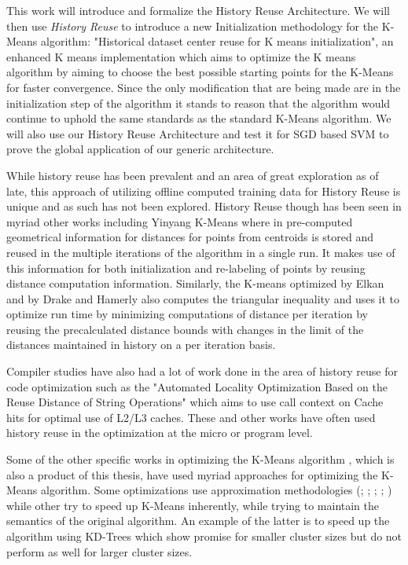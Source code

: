 \documentclass{vldb}
\begin{document}
This work will introduce and formalize the History Reuse Architecture. We will then use \textit{History Reuse} to introduce a new Initialization methodology for the K-Means algorithm: "Historical dataset center reuse for K means initialization", an enhanced K means implementation which aims to optimize the K means algorithm by aiming to choose the best possible starting points for the K-Means\cite{kmeans_orig} for faster convergence. Since the only modification that are being made are in the initialization step of the algorithm it stands to reason that the algorithm would continue to uphold the same standards as the standard K-Means algorithm. We will also use our History Reuse Architecture and test it for SGD based SVM\cite{sgd_svm} to prove the global application of our generic architecture.

While history reuse has been prevalent and an area of great exploration as of late, this approach of utilizing offline computed training data for History Reuse is unique and as such has not been explored. History Reuse though has been seen in myriad other works including Yinyang K-Means \cite{yinyang_kmeans} where in pre-computed geometrical information for distances for points from centroids is stored and reused in the multiple iterations of the algorithm in a single run. It makes use of this information for both initialization and re-labeling of points by reusing distance computation information. Similarly, the K-means optimized by Elkan \cite{Elkan03usingthe} and by Drake and Hamerly\cite{drake} also computes the triangular inequality and uses it to optimize run time by minimizing computations of distance per iteration by reusing the precalculated distance bounds with changes in the limit of the distances maintained in history on a per iteration basis.

Compiler studies have also had a lot of work done in the area of history reuse for code optimization such as the "Automated Locality Optimization Based on the Reuse Distance of String Operations" \cite{auto_cache_opt} which aims to use call context on Cache hits for optimal use of L2/L3 caches. These and other works\cite{value_reuse_extended}\cite{load_reuse_proceeding}\cite{load_reuse_proceeding_article}\cite{locality_block_reuse} have often used history reuse in the optimization at the micro or program level. 

Some of the other specific works in optimizing the K-Means algorithm \cite{kmeans_orig}, which is also a product of this thesis, have used myriad approaches for optimizing the K-Means algorithm. Some optimizations use approximation methodologies (\cite{Czumaj}; \cite{Sculley}; \cite{4270197}; \cite{Guha:1998:CEC:276305.276312}; \cite{Zeng:2012:FAK:2354409.2354758}) while other try to speed up K-Means inherently, while trying to maintain the semantics of the original algorithm. An example of the latter is to speed up the algorithm using KD-Trees \cite{Pelleg:1999:AEK:312129.312248}\cite{Kanungo:2002:EKC:628329.628801} which show promise for smaller cluster sizes but do not perform as well for larger cluster sizes.
\end{document}
